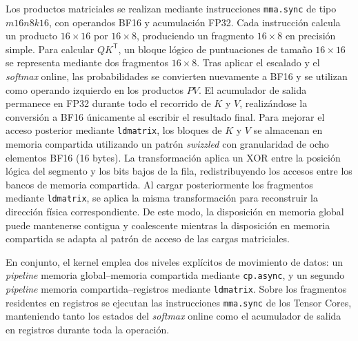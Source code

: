 Los productos matriciales se realizan mediante instrucciones \texttt{mma.sync} de tipo \(m16n8k16\), con operandos BF16 y acumulación FP32. Cada instrucción calcula un producto \(16\times16\) por \(16\times8\), produciendo un fragmento \(16\times8\) en precisión simple. Para calcular \(QK^\mathsf{T}\), un bloque lógico de puntuaciones de tamaño \(16\times16\) se representa mediante dos fragmentos \(16\times8\). Tras aplicar el escalado y el \textit{softmax} online, las probabilidades se convierten nuevamente a BF16 y se utilizan como operando izquierdo en los productos \(PV\). El acumulador de salida permanece en FP32 durante todo el recorrido de \(K\) y \(V\), realizándose la conversión a BF16 únicamente al escribir el resultado final.
Para mejorar el acceso posterior mediante \texttt{ldmatrix}, los bloques de \(K\) y \(V\) se almacenan en memoria compartida utilizando un patrón \textit{swizzled} con granularidad de ocho elementos BF16 (16 bytes). La transformación aplica un XOR entre la posición lógica del segmento y los bits bajos de la fila, redistribuyendo los accesos entre los bancos de memoria compartida. Al cargar posteriormente los fragmentos mediante \texttt{ldmatrix}, se aplica la misma transformación para reconstruir la dirección física correspondiente. De este modo, la disposición en memoria global puede mantenerse contigua y coalescente mientras la disposición en memoria compartida se adapta al patrón de acceso de las cargas matriciales.

En conjunto, el kernel emplea dos niveles explícitos de movimiento de datos: un \textit{pipeline} memoria global--memoria compartida mediante \texttt{cp.async}, y un segundo \textit{pipeline} memoria compartida--registros mediante \texttt{ldmatrix}. Sobre los fragmentos residentes en registros se ejecutan las instrucciones \texttt{mma.sync} de los Tensor Cores, manteniendo tanto los estados del \textit{softmax} online como el acumulador de salida en registros durante toda la operación.

